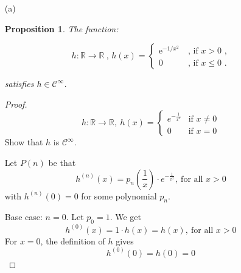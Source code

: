 \documentclass[12pt, reqno]{amsart}
\newtheorem{prop}{Proposition}[section]
\theoremstyle{definition}
\theoremstyle{remark}
\begin{document}
\begin{itemize}




\vspace{0.1 cm}
\begin{itemize}
\item[(a)] %

\begin{prop}
    
    The function: 
    

\begin{equation}
h: \mathbb{R} \to \mathbb{R} ~\mbox{, } h(x) = \begin{cases} \mathrm{e}^{-1/x^2} & ~\mbox{, if $x > 0$ ,} \\ 0 & ~\mbox{, if $x \leq 0$ .} \end{cases}
\end{equation}

satisfies $h\in\mathcal{C}^\infty$.

\end{prop}

\begin{proof}
    
$$h:\mathbb{R}\rightarrow \mathbb{R},~h(x)=\begin{cases}e^{- \frac{1}{x^{2}}} & \text{if }x\ne0 \\
    0 & \text{if }x=0\end{cases}$$
    Show that $h$ is $\mathcal{C}^{\infty}$. 
    
    Let $P(n)$ be that $$h^{(n)}(x)=p_{n}\left(\frac{1}{x}\right)\cdot e^{-\frac{1}{x^{2}}},~\text{for all }x>0$$with $h^{(n)}(0)=0$ for some polynomial $p_{n}$.
    
    Base case: $n=0$. 
    Let $p_{0}=1$. We get $$h^{(0)}(x)=1\cdot h(x)=h(x),~\text{for all }x>0$$
    For $x=0$, the definition of $h$ gives $$h^{(0)}(0)=h(0)=0$$
    

\end{proof}
\end{itemize}
\end{itemize}
\end{document}

